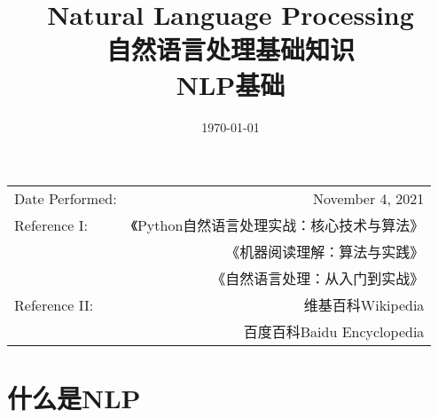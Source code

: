 \documentclass[UTF8]{ctexart}
\title{Natural Language Processing \\ 自然语言处理基础知识 \\ NLP基础} %
\date{\today} %
\begin{document}
\maketitle %

\begin{center}
\begin{tabular}{l r}
Date Performed: & November 4, 2021 \\ %
Reference I: & 《Python自然语言处理实战：核心技术与算法》 \\ %
& 《机器阅读理解：算法与实践》 \\
& 《自然语言处理：从入门到实战》\\
Reference II:& 维基百科Wikipedia\\
& 百度百科Baidu Encyclopedia\\
\end{tabular}
\end{center}



\section{什么是NLP}



\end{document}
